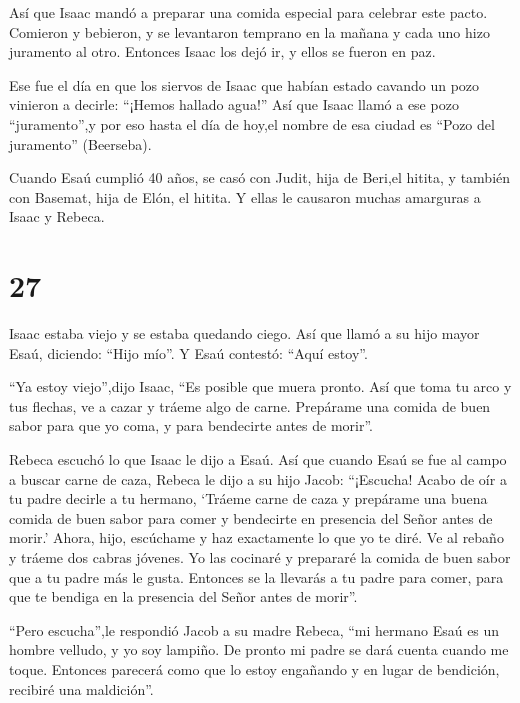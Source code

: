  Así que Isaac mandó a preparar una comida especial para
celebrar este pacto. Comieron y bebieron,  y se levantaron
temprano en la mañana y cada uno hizo juramento al otro. Entonces Isaac
los dejó ir, y ellos se fueron en paz.

 Ese fue el día en que los siervos de Isaac que habían
estado cavando un pozo vinieron a decirle: ``¡Hemos hallado agua!''
 Así que Isaac llamó a ese pozo ``juramento'',y por eso
hasta el día de hoy,el nombre de esa ciudad es ``Pozo del juramento''
(Beerseba).

 Cuando Esaú cumplió 40 años, se casó con Judit, hija de
Beri,el hitita, y también con Basemat, hija de Elón, el hitita.
 Y ellas le causaron muchas amarguras a Isaac y Rebeca.

\hypertarget{section-26}{%
\section{27}\label{section-26}}

 Isaac estaba viejo y se estaba quedando ciego. Así que
llamó a su hijo mayor Esaú, diciendo: ``Hijo mío''. Y Esaú contestó:
``Aquí estoy''.

 ``Ya estoy viejo'',dijo Isaac, ``Es posible que muera
pronto.  Así que toma tu arco y tus flechas, ve a cazar y
tráeme algo de carne.  Prepárame una comida de buen sabor
para que yo coma, y para bendecirte antes de morir''.

 Rebeca escuchó lo que Isaac le dijo a Esaú. Así que cuando
Esaú se fue al campo a buscar carne de caza,  Rebeca le dijo
a su hijo Jacob: ``¡Escucha! Acabo de oír a tu padre decirle a tu
hermano,  `Tráeme carne de caza y prepárame una buena comida
de buen sabor para comer y bendecirte en presencia del Señor antes de
morir.'  Ahora, hijo, escúchame y haz exactamente lo que yo
te diré.  Ve al rebaño y tráeme dos cabras jóvenes. Yo las
cocinaré y prepararé la comida de buen sabor que a tu padre más le
gusta.  Entonces se la llevarás a tu padre para comer, para
que te bendiga en la presencia del Señor antes de morir''.

 ``Pero escucha'',le respondió Jacob a su madre Rebeca,
``mi hermano Esaú es un hombre velludo, y yo soy lampiño. 
De pronto mi padre se dará cuenta cuando me toque. Entonces parecerá
como que lo estoy engañando y en lugar de bendición, recibiré una
maldición''.


